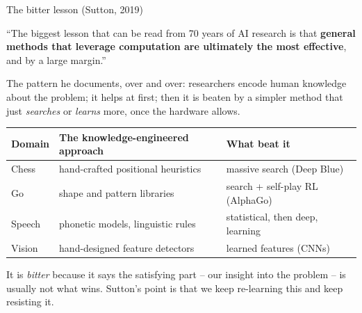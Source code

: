 \documentclass[aspectratio=169]{beamer}
\begin{document}
\begin{frame}{The bitter lesson (Sutton, 2019)}
  \begin{tcolorbox}[colback=armblue!8, colframe=armblue, boxrule=0.8pt, arc=2pt]
    \small
    ``The biggest lesson that can be read from 70 years of AI research is that \textbf{general
    methods that leverage computation are ultimately the most effective}, and by a large
    margin.''
  \end{tcolorbox}

  \vskip 6pt
  \footnotesize
  The pattern he documents, over and over: researchers encode human knowledge about the
  problem; it helps at first; then it is beaten by a simpler method that just \emph{searches}
  or \emph{learns} more, once the hardware allows.

  \vskip 6pt
  \begin{center}
  \scriptsize
  \begin{tabular}{l l l}
    \toprule
    \textbf{Domain} & \textbf{The knowledge-engineered approach} & \textbf{What beat it} \\
    \midrule
    Chess & hand-crafted positional heuristics & massive search (Deep Blue) \\
    Go & shape and pattern libraries & search + self-play RL (AlphaGo) \\
    Speech & phonetic models, linguistic rules & statistical, then deep, learning \\
    Vision & hand-designed feature detectors & learned features (CNNs) \\
    \bottomrule
  \end{tabular}
  \end{center}

  \vskip 6pt
  \begin{tcolorbox}[colback=armred!8, colframe=armred, boxrule=0.6pt, arc=2pt]
    \footnotesize
    It is \emph{bitter} because it says the satisfying part -- our insight into the problem --
    is usually not what wins. Sutton's point is that we keep re-learning this and keep
    resisting it.
  \end{tcolorbox}
\end{frame}
\end{document}
